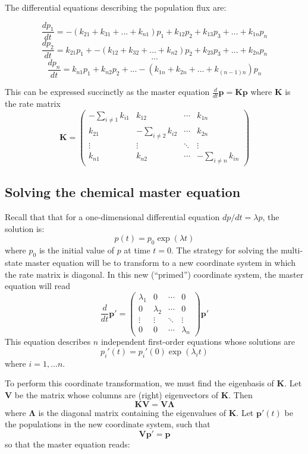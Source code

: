 \documentclass[11pt, oneside]{article}   	%
\begin{document}
The differential equations describing the population flux are:

$$\frac{dp_1}{dt} = -(k_{21}+k_{31}+ ... +k_{n1})p_1 + k_{12} p_2 +k_{13} p_3 + ... +  k_{1n} p_n $$
$$\frac{dp_2}{dt} = k_{21} p_1 + -(k_{12}+k_{32}+ ... +k_{n2})p_2 + k_{23} p_3 + ... +  k_{2n} p_n $$
$$ ... $$
$$\frac{dp_n}{dt} = k_{n1} p_1 + k_{n2} p_2 + ...   -(k_{1n}+k_{2n}+ ... +k_{(n-1)n})p_n$$

This can be expressed succinctly as the master equation  $\frac{d}{dt} \mathbf{p} = \mathbf{K} \mathbf{p}$ where $\mathbf{K}$ is the rate matrix
$$\mathbf{K} =
 \begin{pmatrix}
  -\sum_{i \neq 1} k_{i1} & k_{12} & \cdots & k_{1n} \\
  k_{21} & -\sum_{i \neq 2}k_{i2} & \cdots & k_{2n} \\
  \vdots  & \vdots  & \ddots & \vdots  \\
  k_{n1} & k_{n2} & \cdots & -\sum_{i \neq n}k_{in}
 \end{pmatrix}
$$

\subsection*{Solving the chemical master equation}

Recall that that for a one-dimensional differential equation $dp/dt = \lambda p$, the solution is:
\[
p(t) = p_0 \exp(\lambda t)
\]
where $p_0$ is the initial value of $p$ at time $t=0$.   The strategy for solving the multi-state master equation will be to transform to a new coordinate system in which the rate matrix is diagonal.  In this new (``primed'') coordinate system, the master equation will read
\[
\frac{d}{dt} \mathbf{p}' =  \begin{pmatrix}
  \lambda_1 & 0 & \cdots & 0 \\
 0 & \lambda_2 & \cdots & 0 \\
  \vdots  & \vdots  & \ddots & \vdots  \\
  0 & 0 & \cdots & \lambda_n
 \end{pmatrix} \mathbf{p}' 
\]
This equation describes $n$ independent first-order equations whose solutions are
$$p_i'(t) = p_i'(0) \exp (\lambda_i t)$$
where $i = 1, ... n$.
 
To perform this coordinate transformation, we must find the eigenbasis of $\mathbf{K}$.  Let $\mathbf{V}$ be the matrix whose columns are (right) eigenvectors of $\mathbf{K}$. Then
\[
\mathbf{K} \mathbf{V} = \mathbf{V} \mathbf{\Lambda}
\]
where $\mathbf{\Lambda}$ is the diagonal matrix containing the eigenvalues of $\mathbf{K}$.  Let $\mathbf{p}'(t)$ be the populations in the new coordinate system, such that
$$\mathbf{V}\mathbf{p}' = \mathbf{p}$$
so that the master equation reads:
\end{document}
